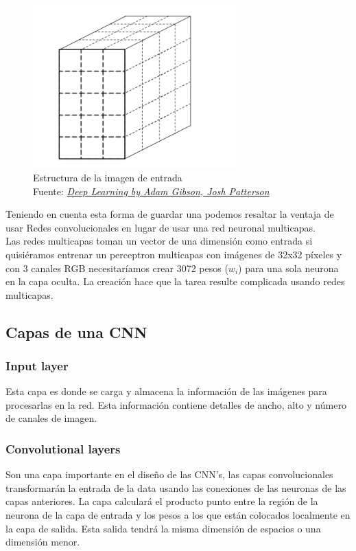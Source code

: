 \begin{figure}[H]
	\centering
	\includegraphics[width=0.7\textwidth]{Figures/image.png}
	\caption{Estructura de la imagen de entrada \\ Fuente:  \href{https://www.safaribooksonline.com/library/view/deep-learning/9781491924570/ch04.html}{\textit{Deep Learning by Adam Gibson, Josh Patterson}}}
	\label{image}
\end{figure} 

Teniendo en cuenta esta forma de guardar una podemos resaltar la ventaja de usar Redes convolucionales en lugar de usar una red neuronal multicapas.\\ Las redes multicapas toman un vector de una dimensión como entrada si quisiéramos entrenar un perceptron multicapas con imágenes de 32x32 píxeles y con 3 canales RGB necesitaríamos crear 3072 pesos ($w_{i}$) para una sola neurona en la capa oculta. La creación hace que la tarea resulte complicada usando redes multicapas.
\subsection{Capas de una CNN}

\subsubsection{Input layer}
Esta capa es donde se carga y almacena la información de las imágenes para procesarlas en la red. Esta información contiene detalles de ancho, alto y número de canales de imagen.

\subsubsection{Convolutional layers}
Son una capa importante en el diseño de las CNN's, las capas convolucionales transformarán la entrada de la data usando las conexiones de las neuronas de las capas anteriores. La capa calculará el producto punto entre la región de la neurona de la capa de entrada y los pesos a los que están colocados localmente en la capa de salida. Esta salida tendrá la misma dimensión de espacios o una dimensión menor.

